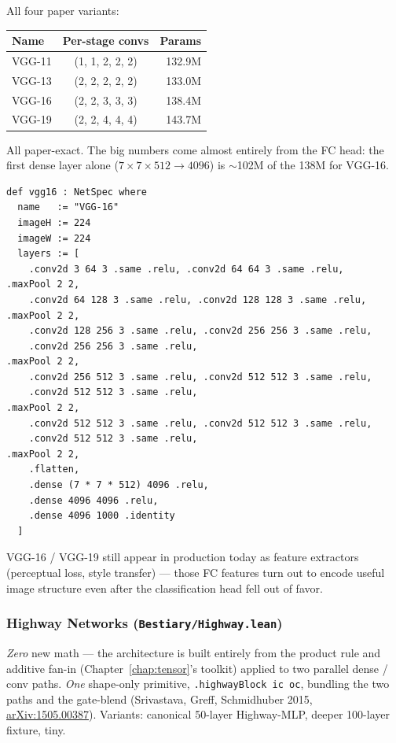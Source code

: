 All four paper variants:

\begin{center}
\begin{tabular}{l c r}
\hline
Name    & Per-stage convs    & Params \\
\hline
VGG-11  & (1, 1, 2, 2, 2)    & 132.9M \\
VGG-13  & (2, 2, 2, 2, 2)    & 133.0M \\
VGG-16  & (2, 2, 3, 3, 3)    & 138.4M \\
VGG-19  & (2, 2, 4, 4, 4)    & 143.7M \\
\hline
\end{tabular}
\end{center}

All paper-exact. The big numbers come almost entirely from the FC
head: the first dense layer alone ($7\times 7\times 512 \to 4096$)
is $\sim$102M of the 138M for VGG-16.

\begin{verbatim}
def vgg16 : NetSpec where
  name   := "VGG-16"
  imageH := 224
  imageW := 224
  layers := [
    .conv2d 3 64 3 .same .relu, .conv2d 64 64 3 .same .relu,    .maxPool 2 2,
    .conv2d 64 128 3 .same .relu, .conv2d 128 128 3 .same .relu, .maxPool 2 2,
    .conv2d 128 256 3 .same .relu, .conv2d 256 256 3 .same .relu,
    .conv2d 256 256 3 .same .relu,                              .maxPool 2 2,
    .conv2d 256 512 3 .same .relu, .conv2d 512 512 3 .same .relu,
    .conv2d 512 512 3 .same .relu,                              .maxPool 2 2,
    .conv2d 512 512 3 .same .relu, .conv2d 512 512 3 .same .relu,
    .conv2d 512 512 3 .same .relu,                              .maxPool 2 2,
    .flatten,
    .dense (7 * 7 * 512) 4096 .relu,
    .dense 4096 4096 .relu,
    .dense 4096 1000 .identity
  ]
\end{verbatim}

VGG-16 / VGG-19 still appear in production today as feature
extractors (perceptual loss, style transfer) --- those FC features
turn out to encode useful image structure even after the
classification head fell out of favor.

\subsubsection*{Highway Networks (\texttt{Bestiary/Highway.lean})}
\emph{Zero} new math --- the architecture is built entirely from the
product rule and additive fan-in (Chapter~\ref{chap:tensor}'s
toolkit) applied to two parallel dense / conv paths. \emph{One}
shape-only primitive, \texttt{.highwayBlock ic oc}, bundling the
two paths and the gate-blend (Srivastava, Greff, Schmidhuber 2015,
\href{https://arxiv.org/abs/1505.00387}{arXiv:1505.00387}). Variants:
canonical 50-layer Highway-MLP, deeper 100-layer fixture, tiny.

